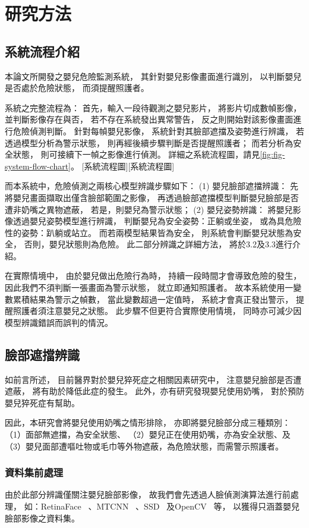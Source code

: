 \documentclass[class=NCU_thesis, crop=false]{standalone}
\begin{document}
\chapter{研究方法}

\section{系統流程介紹}
本論文所開發之嬰兒危險監測系統，
其針對嬰兒影像畫面進行識別，
以判斷嬰兒是否處於危險狀態，
而須提醒照護者。

系統之完整流程為：
首先，輸入一段待觀測之嬰兒影片，
將影片切成數幀影像，
並判斷影像存在與否，
若不存在系統發出異常警告，
反之則開始對該影像畫面進行危險偵測判斷。
針對每幀嬰兒影像，
系統針對其臉部遮擋及姿勢進行辨識，
若透過模型分析為警示狀態，
則再經後續步驟判斷是否提醒照護者；
而若分析為安全狀態，
則可接續下一幀之影像進行偵測。
詳細之系統流程圖，請見\cref{fig:fig-system-flow-chart}。
[系統流程圖][系統流程圖]

而本系統中，危險偵測之兩核心模型辨識步驟如下：
(1) 嬰兒臉部遮擋辨識：
先將嬰兒畫面擷取出僅含臉部範圍之影像，
再透過臉部遮擋模型判斷嬰兒臉部是否遭非奶嘴之異物遮蔽，
若是，則嬰兒為警示狀態；
(2) 嬰兒姿勢辨識：
將嬰兒影像透過嬰兒姿勢模型進行辨識，
判斷嬰兒為安全姿勢：正躺或坐姿，
或為具危險性的姿勢：趴躺或站立。
而若兩模型結果皆為安全，
則系統會判斷嬰兒狀態為安全，
否則，嬰兒狀態則為危險。
此二部分辨識之詳細方法，
將於3.2及3.3進行介紹。

在實際情境中，
由於嬰兒做出危險行為時，
持續一段時間才會導致危險的發生，
因此我們不須判斷一張畫面為警示狀態，
就立即通知照護者。
故本系統使用一變數累積結果為警示之幀數，
當此變數超過一定值時，
系統才會真正發出警示，
提醒照護者須注意嬰兒之狀態。
此步驟不但更符合實際使用情境，
同時亦可減少因模型辨識錯誤而誤判的情況。

\section{臉部遮擋辨識}
如前言所述，
目前醫界對於嬰兒猝死症之相關因素研究中，
注意嬰兒臉部是否遭遮蔽，
將有助於降低此症的發生。
此外，亦有研究發現嬰兒使用奶嘴，
對於預防嬰兒猝死症有幫助。

因此，本研究會將嬰兒使用奶嘴之情形排除，
亦即將嬰兒臉部分成三種類別：
（1）面部無遮擋，為安全狀態、
（2）嬰兒正在使用奶嘴，亦為安全狀態、及
（3）嬰兒面部遭嘔吐物或毛巾等外物遮蔽，為危險狀態，而需警示照護者。

\subsection{資料集前處理}
由於此部分辨識僅關注嬰兒臉部影像，
故我們會先透過人臉偵測演算法進行前處理，
如：RetinaFace~\cite{deng_retinaface_2020}
、MTCNN~\cite{xiang_joint_2017}
、SSD~\cite{ye_face_2021}
及OpenCV~\cite{goyal_face_2017}
等，
以獲得只涵蓋嬰兒臉部影像之資料集。
\end{document}
